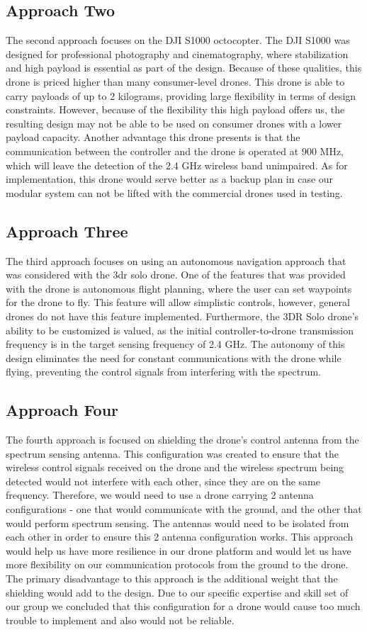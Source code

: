 \subsection{Approach Two}
The second approach focuses on the DJI S1000 octocopter. The DJI S1000 was designed for professional photography and cinematography, where stabilization and high payload is essential as part of the design. Because of these qualities, this drone is priced higher than many consumer-level drones. This drone is able to carry payloads of up to 2 kilograms, providing large flexibility in terms of design constraints. However, because of the flexibility this high payload offers us, the resulting design may not be able to be used on consumer drones with a lower payload capacity. Another advantage this drone presents is that the communication between the controller and the drone is operated at 900 MHz, which will leave the detection of the 2.4 GHz wireless band unimpaired. As for implementation, this drone would serve better as a backup plan in case our modular system can not be lifted with the commercial drones used in testing.

\subsection{Approach Three}
The third approach focuses on using an autonomous navigation approach that was considered with the 3dr solo drone. One of the features that was provided with the drone is autonomous flight planning, where the user can set waypoints for the drone to fly. This feature will allow simplistic controls, however, general drones do not have this feature implemented. Furthermore, the 3DR Solo drone’s ability to be customized is valued, as the initial controller-to-drone transmission frequency is in the target sensing frequency of 2.4 GHz. The autonomy of this design eliminates the need for constant communications with the drone while flying, preventing the control signals from interfering with the spectrum.

\subsection{Approach Four}
The fourth approach is focused on shielding the drone’s control antenna from the spectrum sensing antenna. This configuration was created to ensure that the wireless control signals received on the drone and the wireless spectrum being detected would not interfere with each other, since they are on the same frequency. Therefore, we would need to use a drone carrying 2 antenna configurations - one that would communicate with the ground, and the other that would perform spectrum sensing. The antennas would need to be isolated from each other in order to ensure this 2 antenna configuration works. This approach would help us have more resilience in our drone platform and would let us have more flexibility on our communication protocols from the ground to the drone. The primary disadvantage to this approach is the additional weight that the shielding would add to the design. Due to our specific expertise and skill set of our group we concluded that this configuration for a drone would cause too much trouble to implement and also would not be reliable. 

